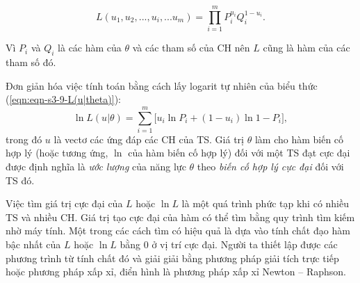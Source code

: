 \begin{equation}\label{eqn:eqn-s3-9-L(u|theta)}
	L(u_1,u_2,...,u_i,...u_m)=\prod_{i=1}^{m}P_i^{u_i}Q_i^{1-u_i}.
\end{equation}\par
Vì $P_i$ và $Q_i$ là các hàm của $\theta$ và các tham số của CH nên $L$ cũng là hàm của các tham số đó.\par
Đơn giản hóa việc tính toán bằng cách lấy logarit tự nhiên của biểu thức (\ref{eqn:eqn-s3-9-L(u|theta)}): $$\ln{L(u|\theta)}=\sum_{i=1}^{m}\big[u_i\ln{P_i}+(1-u_i)\ln{1-P_i}\big],$$
trong đó $u$ là vectơ các ứng đáp các CH của TS. Giá trị $\theta$ làm cho hàm biến cố hợp lý (hoặc tương ứng, $\ln$ của hàm biến cố hợp lý) đối với một TS đạt cực đại được định nghĩa là \textit{ước lượng} của năng lực $\theta$ theo \textit{biến cố hợp lý cực đại} đối với TS đó.\par
Việc tìm giá trị cực đại của $L$ hoặc $\ln{L}$ là một quá trình phức tạp khi có nhiều TS và nhiều CH. Giá trị tạo cực đại của hàm có thể tìm bằng quy trình tìm kiếm nhờ máy tính. Một trong các cách tìm có hiệu quả là dựa vào tính chất đạo hàm bậc nhất của $L$ hoặc $\ln{L}$ bằng $0$ ở vị trí cực đại. Người ta thiết lập được các phương trình từ tính chất đó và giải giải bằng phương pháp giải tích trực tiếp hoặc phương pháp xấp xỉ, điển hình là phương pháp xấp xỉ Newton – Raphson.\par
